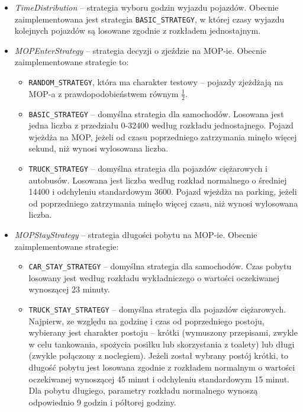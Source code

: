 \begin{itemize}
\item \textit{TimeDistribution} -- strategia wyboru godzin wyjazdu pojazdów. Obecnie zaimplementowana jest strategia \texttt{BASIC\_STRATEGY}, w której czasy wyjazdu kolejnych pojazdów są losowane zgodnie z rozkładem jednostajnym.
\item \textit{MOPEnterStrategy} -- strategia decyzji o zjeździe na MOP-ie. Obecnie zaimplementowane strategie to:
\begin{itemize}
    \item \texttt{RANDOM\_STRATEGY}, która ma charakter testowy -- pojazdy zjeżdżają na MOP-a z prawdopodobieństwem równym $\frac{1}{2}$.
    \item \texttt{BASIC\_STRATEGY} -- domyślna strategia dla samochodów. Losowana jest jedna liczba z przedziału 0-32400 według rozkładu jednostajnego. Pojazd wjeżdża na MOP, jeżeli od czasu poprzedniego zatrzymania minęło więcej sekund, niż wynosi wylosowana liczba.
    \item \texttt{TRUCK\_STRATEGY} -- domyślna strategia dla pojazdów ciężarowych i autobusów. Losowana jest liczba według rozkład normalnego o średniej 14400 i odchyleniu standardowym 3600.  Pojazd wjeżdża na parking, jeżeli od poprzedniego zatrzymania minęło więcej czasu, niż wynosi wylosowana liczba.
\end{itemize}
\item \textit{MOPStayStrategy} -- strategia długości pobytu na MOP-ie. Obecnie zaimplementowane strategie:
\begin{itemize}
    \item \texttt{CAR\_STAY\_STRATEGY} -- domyślna strategia dla samochodów. Czas pobytu losowany jest według rozkładu wykładniczego o wartości oczekiwanej wynoszącej 23 minuty.
    \item \texttt{TRUCK\_STAY\_STRATEGY} -- domyślna strategia dla pojazdów ciężarowych. Najpierw, ze względu na godzinę i czas od poprzedniego postoju, wybierany jest charakter postoju -- krótki (wymuszony przepisami, zwykle w celu tankowania, spożycia posiłku lub skorzystania z toalety) lub długi (zwykle połączony z noclegiem). Jeżeli został wybrany postój krótki, to długość pobytu jest losowana zgodnie z rozkładem normalnym o wartości oczekiwanej wynoszącej 45 minut i odchyleniu standardowym 15 minut. Dla pobytu długiego, parametry rozkładu normalnego wynoszą odpowiednio 9 godzin i półtorej godziny.
\end{itemize}
\end{itemize}

